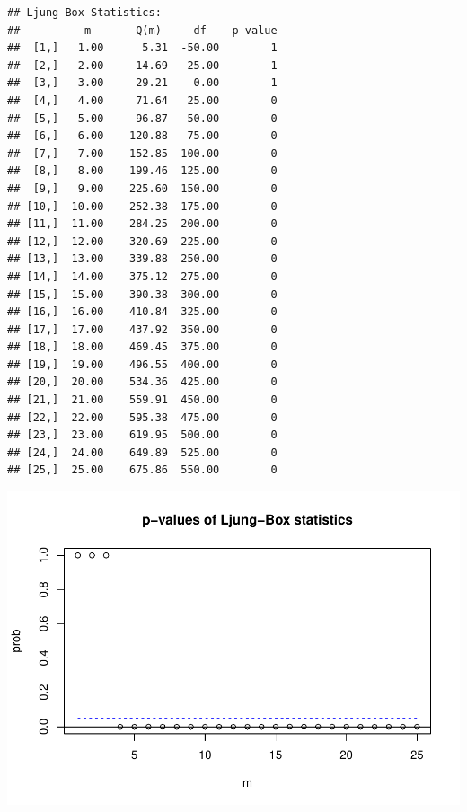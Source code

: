 \documentclass[12pt,a4paper]{article}
\newenvironment{Shaded}{\begin{snugshade}}{\end{snugshade}}
\newcommand{\DataTypeTok}[1]{\textcolor[rgb]{0.13,0.29,0.53}{#1}}
\newcommand{\DecValTok}[1]{\textcolor[rgb]{0.00,0.00,0.81}{#1}}
\newcommand{\FloatTok}[1]{\textcolor[rgb]{0.00,0.00,0.81}{#1}}
\newcommand{\KeywordTok}[1]{\textcolor[rgb]{0.13,0.29,0.53}{\textbf{#1}}}
\newcommand{\NormalTok}[1]{#1}
\newcommand{\OperatorTok}[1]{\textcolor[rgb]{0.81,0.36,0.00}{\textbf{#1}}}
\begin{document}
\begin{verbatim}
## Ljung-Box Statistics:  
##          m       Q(m)     df    p-value
##  [1,]   1.00      5.31  -50.00        1
##  [2,]   2.00     14.69  -25.00        1
##  [3,]   3.00     29.21    0.00        1
##  [4,]   4.00     71.64   25.00        0
##  [5,]   5.00     96.87   50.00        0
##  [6,]   6.00    120.88   75.00        0
##  [7,]   7.00    152.85  100.00        0
##  [8,]   8.00    199.46  125.00        0
##  [9,]   9.00    225.60  150.00        0
## [10,]  10.00    252.38  175.00        0
## [11,]  11.00    284.25  200.00        0
## [12,]  12.00    320.69  225.00        0
## [13,]  13.00    339.88  250.00        0
## [14,]  14.00    375.12  275.00        0
## [15,]  15.00    390.38  300.00        0
## [16,]  16.00    410.84  325.00        0
## [17,]  17.00    437.92  350.00        0
## [18,]  18.00    469.45  375.00        0
## [19,]  19.00    496.55  400.00        0
## [20,]  20.00    534.36  425.00        0
## [21,]  21.00    559.91  450.00        0
## [22,]  22.00    595.38  475.00        0
## [23,]  23.00    619.95  500.00        0
## [24,]  24.00    649.89  525.00        0
## [25,]  25.00    675.86  550.00        0
\end{verbatim}

\includegraphics{solution_exercise_6_files/figure-latex/2_f-1.pdf}

\begin{Shaded}
\end{Shaded}
\end{document}
